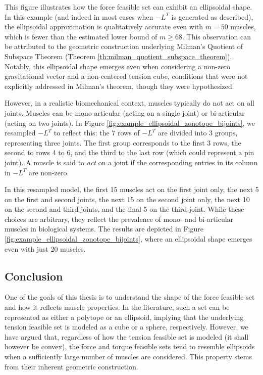 This figure illustrates how the force feasible set can exhibit an ellipsoidal shape. In this example (and indeed in most cases when $-L^T$ is generated as described), the ellipsoidal approximation is qualitatively accurate even with $m = 50$ muscles, which is fewer than the estimated lower bound of $m \geq 68$. This observation can be attributed to the geometric construction underlying Milman's Quotient of Subspace Theorem (Theorem \ref{th:milman_quotient_subspace_theorem}). Notably, this ellipsoidal shape emerges even when considering a non-zero gravitational vector and a non-centered tension cube, conditions that were not explicitly addressed in Milman's theorem, though they were hypothesized.

However, in a realistic biomechanical context, muscles typically do not act on all joints.  Muscles can be mono-articular (acting on a single joint) or bi-articular (acting on two joints). In Figure \ref{fig:example_ellipsoidal_zonotope_bijoints}, we resampled $-L^T$ to reflect this: the 7 rows of $-L^T$ are divided into 3 groups, representing three joints. The first group corresponds to the first 3 rows, the second to rows 4 to 6, and the third to the last row (which could represent a pin joint).  A muscle is said to \emph{act} on a joint if the corresponding entries in its column in $-L^T$ are non-zero.

In this resampled model, the first 15 muscles act on the first joint only, the next 5 on the first and second joints, the next 15 on the second joint only, the next 10 on the second and third joints, and the final 5 on the third joint. While these choices are arbitrary, they reflect the prevalence of mono- and bi-articular muscles in biological systems. The results are depicted in Figure \ref{fig:example_ellipsoidal_zonotope_bijoints}, where an ellipsoidal shape emerges even with just 20 muscles.

\subsection*{Conclusion}
One of the goals of this thesis is to understand the shape of the force feasible set and how it reflects muscle properties. In the literature, such a set can be represented as either a polytope or an ellipsoid, implying that the underlying tension feasible set is modeled as a cube or a sphere, respectively.  However, we have argued that, regardless of how the tension feasible set is modeled (it shall however be convex), the force and torque feasible sets tend to resemble ellipsoids when a sufficiently large number of muscles are considered. This property stems from their inherent geometric construction.


